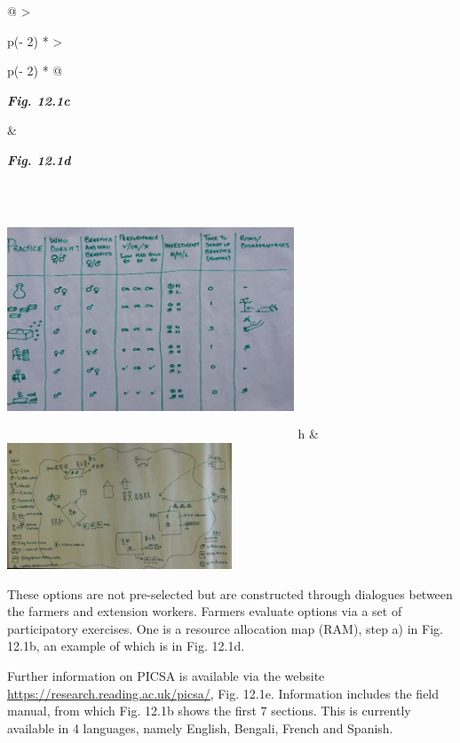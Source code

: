 \documentclass[
  letterpaper,
  DIV=11,
  numbers=noendperiod]{scrreprt}
\begin{document}
\begin{longtable}[]{@{}
  >{\raggedright\arraybackslash}p{(\columnwidth - 2\tabcolsep) * }
  >{\raggedright\arraybackslash}p{(\columnwidth - 2\tabcolsep) * }@{}}
\toprule\noalign{}
\begin{minipage}[b]{\linewidth}\raggedright
\textbf{\emph{Fig. 12.1c}}
\end{minipage} & \begin{minipage}[b]{\linewidth}\raggedright
\textbf{\emph{Fig. 12.1d}}
\end{minipage} \\
\midrule\noalign{}
\endhead
\bottomrule\noalign{}
\endlastfoot
\includegraphics[width=3.36393in,height=2.81471in]{figures/Fig12.1c.png}
h &
\includegraphics[width=2.63599in,height=\textheight]{figures/Fig12.1d.png} \\
\end{longtable}

These options are not pre-selected but are constructed through dialogues
between the farmers and extension workers. Farmers evaluate options via
a set of participatory exercises. One is a resource allocation map
(RAM), step a) in Fig. 12.1b, an example of which is in Fig. 12.1d.

Further information on PICSA is available via the website
\href{https://research.reading.ac.uk/picsa/}{\ul{https://research.reading.ac.uk/picsa/}},
Fig. 12.1e. Information includes the field manual, from which Fig. 12.1b
shows the first 7 sections. This is currently available in 4 languages,
namely English, Bengali, French and Spanish.
\end{document}
